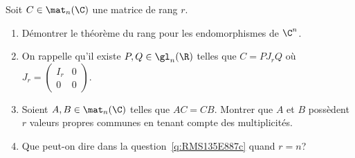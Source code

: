 \begin{enonce}
\begin{exercise}[ID={RMS135 E887edit},subtitle={Mines-Ponts PSI 2024},tags={oraux},difficulty={}]
  Soit $C\in\mat_n(\C)$ une matrice de rang $r$.

  \begin{enumerate}
  \item Démontrer le théorème du rang pour les endomorphismes de $\C^n$.


  \item[] On rappelle  qu'il existe $P,Q\in\gl_n(\R)$ telles que $C = P J_r Q$ où $J_r = \begin{pmatrix} I_r & 0\\ 0 & 0 \end{pmatrix}$.

    \item\label{q:RMS135E887c} Soient $A,B\in\mat_n(\C)$ telles que $AC = CB$.
      Montrer que $A$ et $B$ possèdent $r$ valeurs propres communes en tenant compte des multiplicités.

    \item Que peut-on dire dans la question~\ref{q:RMS135E887c} quand $r=n$?
  \end{enumerate}
\end{exercise}
\begin{solution}
\end{solution}
\end{enonce}
